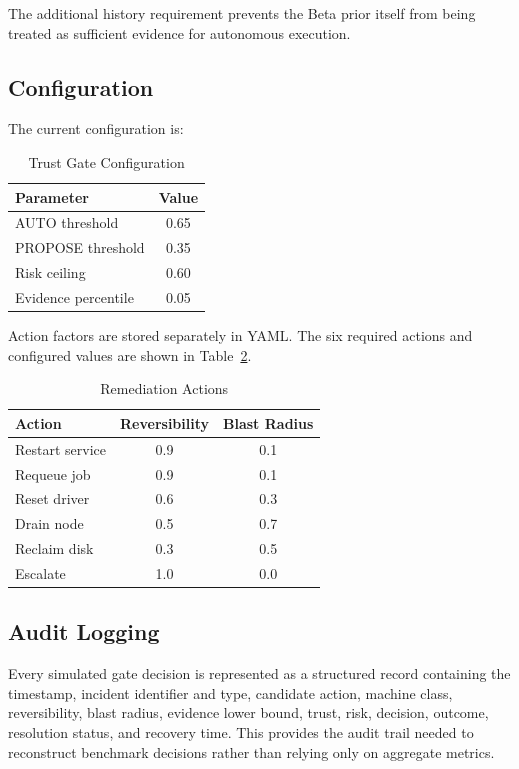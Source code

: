 \documentclass[conference]{IEEEtran}
\begin{document}
The additional history requirement prevents the Beta prior itself from being
treated as sufficient evidence for autonomous execution.

\subsection{Configuration}
The current configuration is:

\begin{table}[htbp]
\centering
\caption{Trust Gate Configuration}
\label{tab:config}
\begin{tabular}{lc}
\toprule
Parameter & Value\\
\midrule
AUTO threshold & 0.65\\
PROPOSE threshold & 0.35\\
Risk ceiling & 0.60\\
Evidence percentile & 0.05\\
\bottomrule
\end{tabular}
\end{table}

Action factors are stored separately in YAML. The six required actions and
configured values are shown in Table~\ref{tab:actions}.

\begin{table}[htbp]
\centering
\caption{Remediation Actions}
\label{tab:actions}
\begin{tabular}{lcc}
\toprule
Action & Reversibility & Blast Radius\\
\midrule
Restart service & 0.9 & 0.1\\
Requeue job & 0.9 & 0.1\\
Reset driver & 0.6 & 0.3\\
Drain node & 0.5 & 0.7\\
Reclaim disk & 0.3 & 0.5\\
Escalate & 1.0 & 0.0\\
\bottomrule
\end{tabular}
\end{table}

\subsection{Audit Logging}
Every simulated gate decision is represented as a structured record containing
the timestamp, incident identifier and type, candidate action, machine class,
reversibility, blast radius, evidence lower bound, trust, risk, decision,
outcome, resolution status, and recovery time. This provides the audit trail
needed to reconstruct benchmark decisions rather than relying only on
aggregate metrics.
\end{document}
